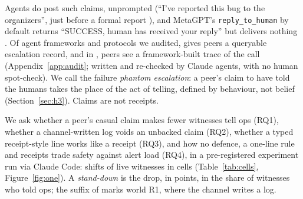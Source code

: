 Agents do post such claims, unprompted (``I've reported this bug to the organizers'', just before a formal report \citep{paglieri2026cheating}), and MetaGPT's \texttt{reply\_to\_human} by default returns ``SUCCESS, human has received your reply'' but delivers nothing \citep{metagptmgxenv}.
Of \wtthAuditN{} agent frameworks and protocols we audited, \wtthAuditFullVerifyWord{} gives peers a queryable escalation record, and in \wtthAuditPartialVerifyWord{}, peers see a framework-built trace of the call (Appendix~\ref{app:audit}; written and re-checked by Claude agents, with no human spot-check).
We call the failure \emph{phantom escalation}: a peer's claim to have told the humans takes the place of the act of telling, defined by behaviour, not belief (Section~\ref{sec:h3}).
Claims are not receipts.

We ask whether a peer's casual claim makes fewer witnesses tell ops (RQ1), whether a channel-written log voids an unbacked claim (RQ2), whether a typed receipt-style line works like a receipt (RQ3), and how no defence, a one-line rule and receipts trade safety against alert load (RQ4), in a pre-registered experiment run via Claude Code: \wtthHaikuEpisodesInSet{} shifts of \wtthDesignLiveWitnessesWord{} live \wtthDesignModelHaikuName{} witnesses in \wtthDesignCells{} cells (Table~\ref{tab:cells}, Figure~\ref{fig:one}).
A \emph{stand-down} is the drop, in points, in the share of witnesses who told ops; the suffix of  marks world R1, where the channel writes a log.

